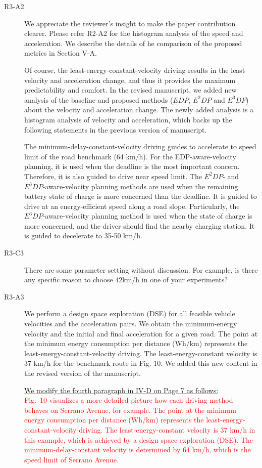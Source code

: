 \documentclass[onecolumn]{IEEEconf}
\begin{document}
\begin{description}
\item [R3-A2] We appreciate the reviewer's insight to make the paper contribution clearer. Please refer R2-A2 for the histogram analysis of the speed and acceleration. We describe the details of he comparison of the proposed metrics in Section V-A. 

Of course, the least-energy-constant-velocity driving results in the least velocity and acceleration change, and thus it provides the maximum predictability and comfort. In the revised manuscript, we added new analysis of the baseline and proposed methods ($EDP$, $E^2DP$ and $E^3DP$) about the velocity and acceleration change. The newly added analysis is a histogram analysis of velocity and acceleration, which backs up the following statements in the previous version of manuscript.

The minimum-delay-constant-velocity driving guides to accelerate to speed limit of the road benchmark (64 km/h). For the EDP-aware-velocity planning, it is used when the deadline is the most important concern. Therefore, it is also guided to drive near speed limit. The $E^2DP$- and $E^3DP$-aware-velocity planning methods are used when the remaining battery state of charge is more concerned than the deadline. It is guided to drive at an energy-efficient speed along a road slope. Particularly, the $E^3DP$-aware-velocity planning method is used when the state of charge is more concerned, and the driver should find the nearby charging station. It is guided to decelerate to 35-50 km/h.


\item [R3-C3] There are some parameter setting without discussion. For example, is there any specific reason to choose 42km/h in one of your experiments?

\item [R3-A3] We perform a design space exploration (DSE) for all feasible vehicle velocities and the acceleration pairs. We obtain the minimum-energy velocity and the initial and final acceleration for a given road. The point at the minimum energy consumption per distance (Wh/km) represents the least-energy-constant-velocity driving. The least-energy-constant velocity is 37 km/h for the benchmark route in Fig. 10. We added this new content in the revised version of the manuscript. 

\uline{We modify the fourth paragraph in IV-D on Page 7 as follows:}\\
\textcolor{red}{
Fig.~10 visualizes a more detailed picture how each driving method behaves on Serrano Avenue, for example. 
The point at the minimum energy consumption per distance (Wh/km) represents the least-energy-constant-velocity driving. The least-energy-constant velocity is 37 km/h in this example, which is achieved by a design space exploration (DSE). The minimum-delay-constant velocity is determined by 64 km/h, which is the speed limit of Serrano Avenue.}


\end{description}
\end{document}

